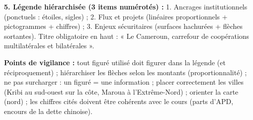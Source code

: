 \documentclass[11pt]{article}
\begin{document}
\begin{corrige}
\textbf{5. Légende hiérarchisée (3 items numérotés) :} 1. Ancrages institutionnels (ponctuels : étoiles, sigles) ; 2. Flux et projets (linéaires proportionnels + pictogrammes + chiffres) ; 3. Enjeux sécuritaires (surfaces hachurées + flèches sortantes). Titre obligatoire en haut : « Le Cameroun, carrefour de coopérations multilatérales et bilatérales ».

\textbf{Points de vigilance :} tout figuré utilisé doit figurer dans la légende (et réciproquement) ; hiérarchiser les flèches selon les montants (proportionnalité) ; ne pas surcharger : un figuré = une information ; placer correctement les villes (Kribi au sud-ouest sur la côte, Maroua à l'Extrême-Nord) ; orienter la carte (nord) ; les chiffres cités doivent être cohérents avec le cours (parts d'APD, encours de la dette chinoise).


\end{corrige}
\end{document}

